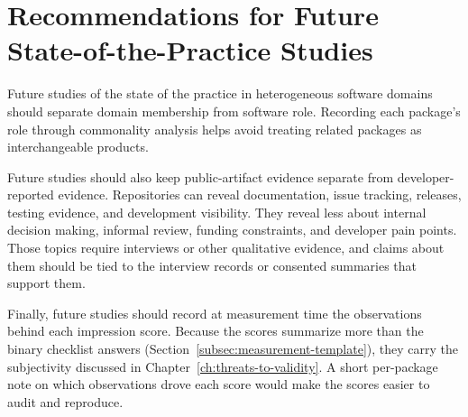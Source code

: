 \section[Recommendations for Future State-of-the-Practice Studies]{Recommendations for Future\\ State-of-the-Practice Studies}
\label{sec:recommendations-sop}

Future studies of the state of the practice in heterogeneous software domains should separate domain membership from software role. Recording each package's role through commonality analysis helps avoid treating related packages as interchangeable products.

Future studies should also keep public-artifact evidence separate from developer-reported evidence. Repositories can reveal documentation, issue tracking, releases, testing evidence, and development visibility. They reveal less about internal decision making, informal review, funding constraints, and developer pain points. Those topics require interviews or other qualitative evidence, and claims about them should be tied to the interview records or consented summaries that support them.

Finally, future studies should record at measurement time the observations behind each impression score. Because the scores summarize more than the binary checklist answers (Section~\ref{subsec:measurement-template}), they carry the subjectivity discussed in Chapter~\ref{ch:threats-to-validity}. A short per-package note on which observations drove each score would make the scores easier to audit and reproduce.
